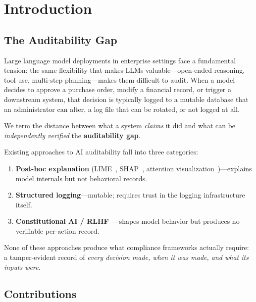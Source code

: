 \documentclass[12pt,letterpaper]{article}
\begin{document}
\section{Introduction}
\label{sec:intro}

\subsection{The Auditability Gap}

Large language model deployments in enterprise settings face a fundamental
tension: the same flexibility that makes LLMs valuable---open-ended reasoning,
tool use, multi-step planning---makes them difficult to audit. When a model
decides to approve a purchase order, modify a financial record, or trigger a
downstream system, that decision is typically logged to a mutable database
that an administrator can alter, a log file that can be rotated, or not logged
at all.

We term the distance between what a system \emph{claims} it did and what can
be \emph{independently verified} the \textbf{auditability gap}.

Existing approaches to AI auditability fall into three categories:
\begin{enumerate}
  \item \textbf{Post-hoc explanation}
    (LIME~\citep{ribeiro2016lime}, SHAP~\citep{lundberg2017shap},
    attention visualization~\citep{jain2019attention})---explains model
    internals but not behavioral records.
  \item \textbf{Structured logging}---mutable; requires trust in the
    logging infrastructure itself.
  \item \textbf{Constitutional AI / RLHF}~\citep{bai2022constitutional,
    ouyang2022instructgpt}---shapes model behavior but produces no
    verifiable per-action record.
\end{enumerate}

None of these approaches produce what compliance frameworks actually require:
a tamper-evident record of \emph{every decision made, when it was made, and
what its inputs were}.

\subsection{Contributions}
\end{document}
